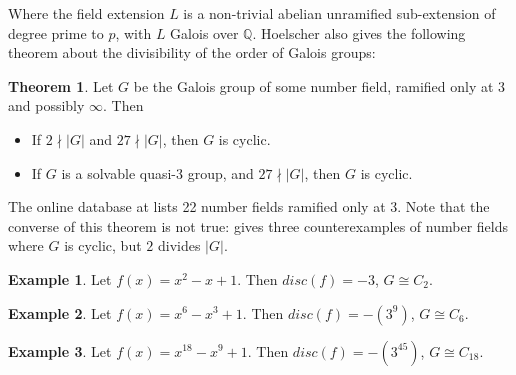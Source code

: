 \documentclass[12pt]{extarticle}
\newcommand{\Q}{\mathbb{Q}}
\newcommand{\<}{\langle}
\renewcommand{\>}{\rangle}
\theoremstyle{definition}
\newtheorem{theorem}{Theorem}
\newtheorem*{example}{Example}
\begin{document}
\par
Where the field extension $L$ is a non-trivial abelian unramified sub-extension of degree prime to $p$, with $L$ Galois over $\Q$.
Hoelscher also gives the following theorem about the divisibility of the order of Galois groups: 
\begin{theorem}
Let $G$ be the Galois group of some number field, ramified only at 3 and possibly $\infty$. Then \begin{itemize}
\item If $2 \nmid |G|$ and $ 27 \nmid |G|$, then $G$ is cyclic.
\item If $G$ is a solvable quasi-3 group, and $ 27 \nmid |G|$, then $G$ is cyclic.
\end{itemize}
\end{theorem}
The online database at \cite{JONE2} lists 22 number fields ramified only at 3. Note that the converse of this theorem is not true: \cite{JONE2} gives three counterexamples of number fields where $G$ is cyclic, but $2$ divides $|G|$. 
\begin{example}
Let $f(x) = x^2-x+1$. Then $disc(f) = -3$, $G \cong C_2$.
\end{example}
\begin{example}
Let $f(x) = x^6-x^3+1$. Then $disc(f) = -(3^9)$, $G \cong C_6$.
\end{example}
\begin{example}
Let $f(x) = x^{18}-x^9+1$. Then $disc(f) = -(3^{45})$, $G \cong C_{18}$.
\end{example}
\end{document}
